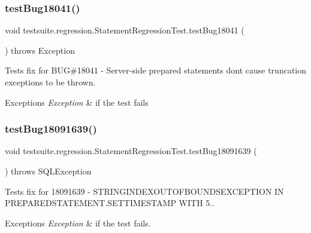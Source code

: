 \subsubsection{\texorpdfstring{test\+Bug18041()}{testBug18041()}}
{\footnotesize\ttfamily void testsuite.\+regression.\+Statement\+Regression\+Test.\+test\+Bug18041 (\begin{DoxyParamCaption}{ }\end{DoxyParamCaption}) throws Exception}

Tests fix for B\+UG\#18041 -\/ Server-\/side prepared statements don\textquotesingle{}t cause truncation exceptions to be thrown.


\begin{DoxyExceptions}{Exceptions}
{\em Exception} & if the test fails \\
\hline
\end{DoxyExceptions}
\mbox{\label{classtestsuite_1_1regression_1_1_statement_regression_test_a01b6dcfb6870df0348d9c1fb80efe81c}} 
\subsubsection{\texorpdfstring{test\+Bug18091639()}{testBug18091639()}}
{\footnotesize\ttfamily void testsuite.\+regression.\+Statement\+Regression\+Test.\+test\+Bug18091639 (\begin{DoxyParamCaption}{ }\end{DoxyParamCaption}) throws S\+Q\+L\+Exception}

Tests fix for 18091639 -\/ S\+T\+R\+I\+N\+G\+I\+N\+D\+E\+X\+O\+U\+T\+O\+F\+B\+O\+U\+N\+D\+S\+E\+X\+C\+E\+P\+T\+I\+ON IN P\+R\+E\+P\+A\+R\+E\+D\+S\+T\+A\+T\+E\+M\+E\+N\+T.\+S\+E\+T\+T\+I\+M\+E\+S\+T\+A\+MP W\+I\+TH 5..


\begin{DoxyExceptions}{Exceptions}
{\em Exception} & if the test fails. \\
\hline
\end{DoxyExceptions}
\mbox{\label{classtestsuite_1_1regression_1_1_statement_regression_test_aee25d7d22ab4c6ef36bab834d6dacc99}} 
